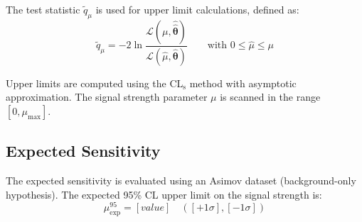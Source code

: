 
The test statistic $\tilde{q}_\mu$ is used for upper limit calculations,
defined as:
\begin{equation}
  \tilde{q}_\mu = -2 \ln \frac{\mathcal{L}(\mu, \hat{\hat{\boldsymbol{\theta}}})}
  {\mathcal{L}(\hat{\mu}, \hat{\boldsymbol{\theta}})}
  \qquad \text{with } 0 \leq \hat{\mu} \leq \mu
\end{equation}

Upper limits are computed using the CL$_\text{s}$ method with asymptotic
approximation. The signal strength parameter $\mu$ is scanned in the range
$[0, \mu_\text{max}]$.

\subsection{Expected Sensitivity}
\label{sec:statistical:sensitivity}


The expected sensitivity is evaluated using an Asimov dataset (background-only
hypothesis). The expected 95\% CL upper limit on the signal strength is:
\begin{equation}
  \mu_\text{exp}^{95} = [value] \quad
  \left( [+1\sigma], [-1\sigma] \right)
\end{equation}

